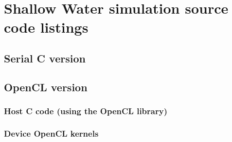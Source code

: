 \chapter{Shallow Water simulation source code listings}
\label{app:code}

\section{Serial C version}



\section{OpenCL version}

\subsection{Host C code (using the OpenCL library)}



\subsection{Device OpenCL kernels}







